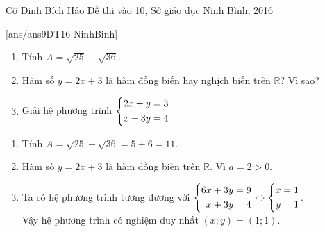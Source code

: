 
\begin{name}
{Cô Đinh Bích Hảo}
{Đề thi vào 10, Sở giáo dục Ninh Bình, 2016}
\end{name}
\setcounter{ex}{0}
[ans/ans9DT16-NinhBinh]
\begin{ex}%
    \hfill
    \begin{enumerate}
    \item Tính $A=\sqrt{25}+\sqrt{36}$.
        \item Hàm số $y=2x+3$ là hàm đồng biến hay nghịch biến  trên  $\mathbb{R}$? Vì sao?
        \item Giải hệ phương trình $\left\{\begin{aligned}2x+y&=3\\ x+3y&=4\end{aligned}\right.$
    \end{enumerate}
\loigiai
    {
    \begin{enumerate}
        \item Tính $A=\sqrt{25}+\sqrt{36}=5+6=11$.
        \item Hàm số $y=2x+3$ là hàm đồng biến  trên  $\mathbb{R}$. Vì $a=2>0$.
        \item Ta có hệ phương trình tương đương với $\left\{\begin{aligned}6x+3y&=9\\ x+3y&=4\end{aligned}\right.\Leftrightarrow \left\{\begin{aligned}x&=1\\ y&=1\end{aligned}\right.$.\\
        Vậy hệ phương trình có nghiệm duy nhất $(x; y)=\left(1; 1\right)$.
    \end{enumerate}
    }
\end{ex}

